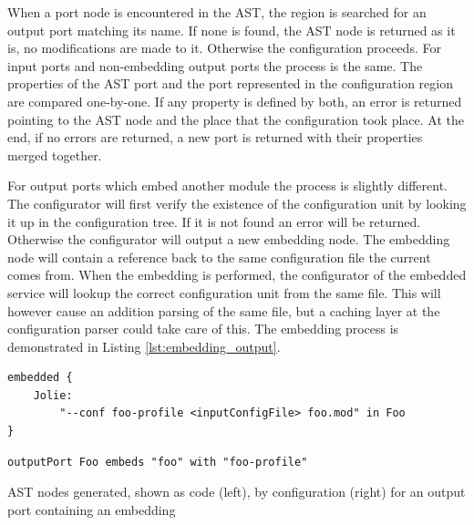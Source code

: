 When a port node is encountered in the AST, the  region is
searched for an output port matching its name. If none is found, the AST node
is returned as it is, no modifications are made to it. Otherwise the
configuration proceeds. For input ports and non-embedding output ports the
process is the same. The properties of the AST port and the port represented in
the configuration region are compared one-by-one. If any property is defined by
both, an error is returned pointing to the AST node and the place that the
configuration took place. At the end, if no errors are returned, a new port is
returned with their properties merged together.

For output ports which embed another module the process is slightly different.
The configurator will first verify the existence of the configuration unit by
looking it up in the configuration tree. If it is not found an error will be
returned. Otherwise the configurator will output a new embedding node. The
embedding node will contain a reference back to the same configuration file the
current  comes from. When the embedding is performed, the
configurator of the embedded service will lookup the correct configuration unit
from the same file. This will however cause an addition parsing of the same
file, but a caching layer at the configuration parser could take care of this.
The embedding process is demonstrated in Listing \ref{lst:embedding_output}.

\begin{listing}[H]
\begin{multicols}{2}

\begin{verbatim}
embedded {
    Jolie:
        "--conf foo-profile <inputConfigFile> foo.mod" in Foo
}
\end{verbatim}

\columnbreak

\begin{verbatim}
outputPort Foo embeds "foo" with "foo-profile"
\end{verbatim}

\end{multicols}

\caption{AST nodes generated, shown as code (left), by configuration (right)
    for an output port containing an embedding}

\label{lst:embedding_output}

\end{listing}

